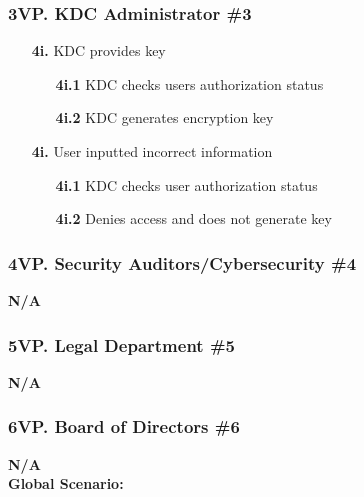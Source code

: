 \documentclass[]{article}
\begin{document}
\subsubsection*{3VP. KDC Administrator \#3}
\begin{enumerate}
	\item[\textbf{4i.}] KDC provides key
		\begin{enumerate}
			\item[\textbf{4i.1}] KDC checks users authorization status
			\item[\textbf{4i.2}] KDC generates encryption key
		\end{enumerate}
	\item[\textbf{4i.}] User inputted incorrect information
		\begin{enumerate}
			\item[\textbf{4i.1}] KDC checks user authorization status
			\item[\textbf{4i.2}] Denies access and does not generate key
		\end{enumerate}
\end{enumerate}
\subsubsection*{4VP. Security Auditors/Cybersecurity \#4}
\textbf{N/A}
\subsubsection*{5VP. Legal Department \#5}
\textbf{N/A}
\subsubsection*{6VP. Board of Directors \#6}
\textbf{N/A}\\

\noindent \textbf{Global Scenario:}
\end{document}
